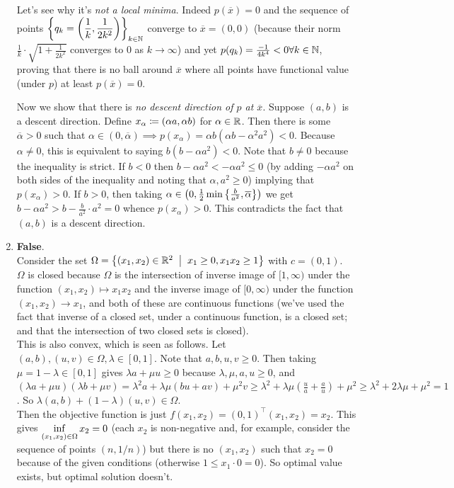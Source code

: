 \begin{enumerate}[leftmargin=*]
Let's see why it's \textit{not a local minima}. Indeed $p(\overline x) = 0$ and the sequence of points $\displaystyle\left\{q_k=\left(\frac{1}{k},\frac{1}{2k^2}\right)\right\}_{k\in\mathbb{N}}$ converge to $\overline x = (0,0)$ (because their norm $\frac{1}{k}\cdot \sqrt{1+\frac{1}{2k^2}}$ converges to $0$ as $k\to\infty$) and yet $p(q_k) = \frac{-1}{4k^4}<0\forall k\in\mathbb{N}$, proving that there is no ball around $\overline x$ where all points have functional value (under $p$) at least $p(\overline x) = 0$.

Now we show that there is \textit{no descent direction of $p$ at $\overline x$}. Suppose $(a,b)$ is a descent direction. Define $x_\alpha \coloneqq (\alpha a,\alpha b)$ for $\alpha\in \mathbb{R}$. Then there is some $\overline \alpha>0$ such that $\alpha\in(0,\overline \alpha)\implies p(x_\alpha) = \alpha b(\alpha b-\alpha^2a^2)<0$. Because $\alpha\neq 0$, this is equivalent to saying $b(b-\alpha a^2)<0$. Note that $b\neq 0$ because the inequality is strict. If $b<0$ then $b-\alpha a^2 < -\alpha a^2 \leq 0$ (by adding $-\alpha a^{2}$ on both sides of the inequality and noting that $\alpha,a^{2}\geq 0$) implying that $p(x_\alpha) > 0$. If $b>0$, then taking $\alpha\in \left(0,\frac{1}{2}\min\left\{\frac{b}{a^2},\overline \alpha\right\}\right)$ we get $b-\alpha a^2 > b-\frac{b}{a^2}\cdot a^2 = 0$ whence $p(x_\alpha)>0$. This contradicts the fact that $(a,b)$ is a descent direction.

\item \textbf{False}.\\
Consider the set $\Omega = \set{(x_1,x_2)\in \R^2\st x_1\geq0, x_1x_2\geq 1}$ with $c=(0,1)$. \\
$\Omega$ is closed because $\Omega$ is the intersection of inverse image of $[1,\infty)$ under the function $(x_1,x_2)\mapsto x_1x_2$ and the inverse image of $[0,\infty)$ under the function $(x_1,x_2)\to x_1$, and both of these are continuous functions (we've used the fact that inverse of a closed set, under a continuous function, is a closed set; and that the intersection of two closed sets is closed). \\
This is also convex, which is seen as follows. Let $(a,b),(u,v)\in \Omega, \lambda\in[0,1]$. Note that $a,b,u,v\geq 0$. Then taking $\mu=1-\lambda\in[0,1]$ gives $\lambda a + \mu u \geq 0$ because $\lambda,\mu,a,u\geq 0$, and $(\lambda a + \mu u)(\lambda b + \mu v) = \lambda^2 a + \lambda\mu(bu+av) + \mu^2 v \geq \lambda^2 + \lambda\mu\left(\frac{u}{a} + \frac{a}{u}\right) + \mu^2 \ge \lambda^2 + 2\lambda\mu + \mu^2 = 1$. So $\lambda (a,b) + (1-\lambda)(u,v) \in\Omega$.\\
Then the objective function is just $f(x_1,x_2) = (0,1)^\top(x_1,x_2) = x_2$. This gives $\displaystyle\inf_{(x_1,x_2)\in\Omega} x_2 = 0$ (each $x_{2}$ is non-negative and, for example, consider the sequence of points $(n,1/n)$) but there is no $(x_1,x_2)$ such that $x_2=0$ because of the given conditions (otherwise $1\leq x_{1}\cdot 0 = 0$). So optimal value exists, but optimal solution doesn't.
\end{enumerate}
